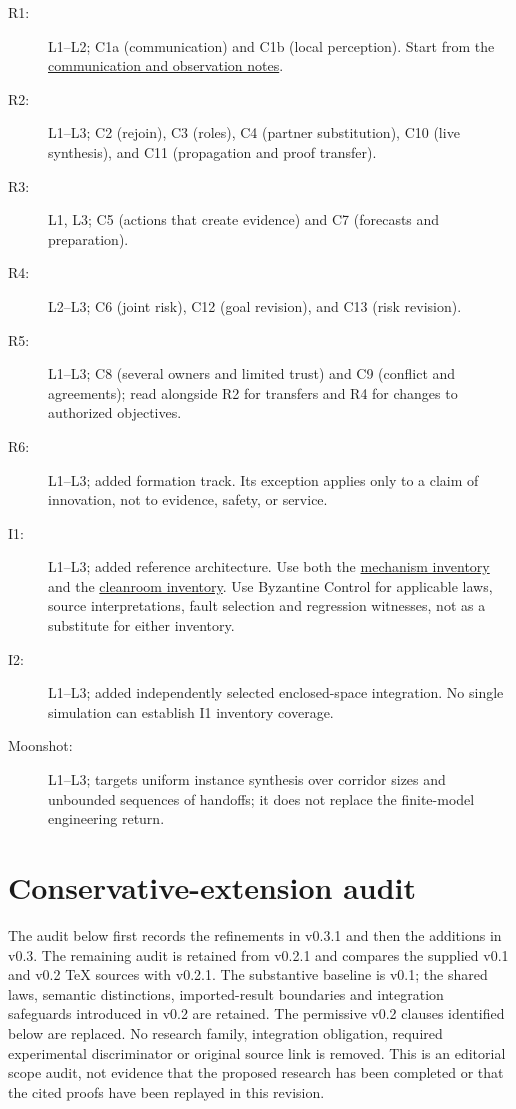 \documentclass[11pt]{article}
\begin{document}
\begin{description}
\item[R1:] L1--L2; C1a (communication) and C1b (local perception). Start from the \href{https://github.com/eternal-november/eos-research-programmes/blob/4359a8a1484498b9c46d8e58a0112448a1fba06b/projects/swarm-coordination/research/communication/Communication_Regimes.tex}{communication and observation notes}.
\item[R2:] L1--L3; C2 (rejoin), C3 (roles), C4 (partner substitution), C10 (live synthesis), and C11 (propagation and proof transfer).
\item[R3:] L1, L3; C5 (actions that create evidence) and C7 (forecasts and preparation).
\item[R4:] L2--L3; C6 (joint risk), C12 (goal revision), and C13 (risk revision).
\item[R5:] L1--L3; C8 (several owners and limited trust) and C9 (conflict and agreements); read alongside R2 for transfers and R4 for changes to authorized objectives.
\item[R6:] L1--L3; added formation track. Its exception applies only to a claim of innovation, not to evidence, safety, or service.
\item[I1:] L1--L3; added reference architecture. Use both the \href{https://github.com/eternal-november/eos-research-programmes/blob/4359a8a1484498b9c46d8e58a0112448a1fba06b/projects/swarm-coordination/fault-inventory/Swarm_Coordination_Fault_Inventory.tex}{mechanism inventory} and the \href{https://github.com/eternal-november/eos-research-programmes/blob/4359a8a1484498b9c46d8e58a0112448a1fba06b/projects/swarm-coordination/fault-inventory/Swarm_Fault_Inventory_Cleanroom.tex}{cleanroom inventory}. Use Byzantine Control for applicable laws, source interpretations, fault selection and regression witnesses, not as a substitute for either inventory.
\item[I2:] L1--L3; added independently selected enclosed-space integration. No single simulation can establish I1 inventory coverage.
\item[Moonshot:] L1--L3; targets uniform instance synthesis over corridor sizes and unbounded sequences of handoffs; it does not replace the finite-model engineering return.
\end{description}

\section{Conservative-extension audit}\label{sec:audit}
The audit below first records the refinements in v0.3.1 and then the additions in v0.3. The remaining audit is retained from v0.2.1 and compares the supplied v0.1 and v0.2 TeX sources with v0.2.1. The substantive baseline is v0.1; the shared laws, semantic distinctions, imported-result boundaries and integration safeguards introduced in v0.2 are retained. The permissive v0.2 clauses identified below are replaced. No research family, integration obligation, required experimental discriminator or original source link is removed. This is an editorial scope audit, not evidence that the proposed research has been completed or that the cited proofs have been replayed in this revision.
\end{document}
